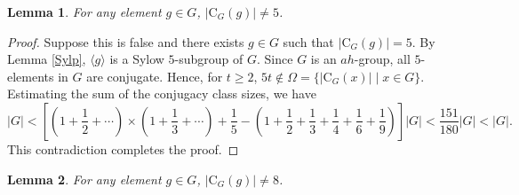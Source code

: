 \documentclass[11pt]{article}
\providecommand{\C}{{\mathrm{C}}}
\providecommand{\gen}[1]{\langle #1 \rangle} %
\providecommand{\gen}[1]{\langle #1 \rangle} %
\providecommand{\gen}[1]{\langle #1 \rangle} %
\newtheorem{lem}{Lemma}
\begin{document}
\begin{lem}
    For any element $g \in G$, $|\C_G(g)| \neq 5$.
\end{lem}

\begin{proof}
    Suppose this is false and there exists $g\in G$ such that $|\C_G(g)|=5$.
    By Lemma \ref{Sylp}, $\gen{g}$ is a Sylow $5$-subgroup of $G$.
    Since $G$ is an $ah$-group, all $5$-elements in $G$ are conjugate.
    Hence, for $t\geq 2$, $5t\notin \Omega = \{|\C_G(x)| \mid x\in G\}$.
    Estimating the sum of the conjugacy class sizes, we have 
    $$ |G| < [(1+\dfrac{1}{2} + \cdots)\times (1 + \dfrac{1}{3} + \cdots ) + \dfrac{1}{5}
    - (1 + \dfrac{1}{2} +\dfrac{1}{3}+\dfrac{1}{4} +\dfrac{1}{6} +\dfrac{1}{9})]|G|
    <\dfrac{151}{180}|G|
    <|G|. $$
    This contradiction completes the proof.
\end{proof}

\begin{lem}
    For any element $g \in G$, $|\C_G(g)| \neq 8$.
\end{lem}
\end{document}
